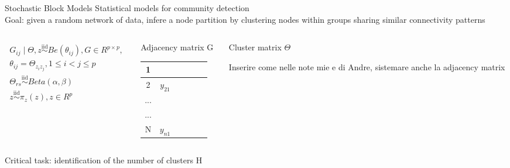 \begin{frame}{Stochastic Block Models}
    Statistical models for \alert{community detection}\\     
    Goal: given a random network of data, infere a node partition by clustering nodes within groups sharing similar connectivity patterns


    \begin{columns}
        \begin{column}{0.30\textwidth}
            \begin{align*}
                G_{ij} \mid \Theta,z \overset{\mathrm{iid}}{\sim} Be(\theta_{ij}),  G \in R^{p×p}, \\
                \theta_{ij} = \Theta_{z_{i}z_{j}}, 1 \le i < j \le p \\ 
                \Theta_{rs} \overset{\mathrm{iid}}{\sim} Beta(\alpha, \beta)\\
                z \overset{\mathrm{iid}}{\sim} \pi_{z}(z), z \in R^p
            \end{align*}
            \end{column}
        \begin{column}{0.30\textwidth}
            \alert{Adjacency matrix G}
            \begin{table}[htpb]
            \centering
            \begin{tabular}{c|c|c|c|c|c|} 
            \hline
            1   & &    &    &   &     \\ 
            \hline
            2  &  $y_{21}$ &    &    &   &     \\ 
            \hline
            ...  &   &    &    &   &     \\ 
            \hline
            ...  &   &    &    &   &     \\ 
            \hline
            N  & $y_{n1}$   &    &    &   &  
            \end{tabular}
            \end{table}
        \end{column}


        \begin{column}{0.25\textwidth}
        \alert{Cluster matrix $\Theta$}

        Inserire come nelle note mie e di Andre, sistemare anche la adjacency matrix
        \end{column}

    \end{columns}



    \begin{center}
    Critical task: \alert{identification of the number of clusters H}
    \end{center}


\end{frame}















